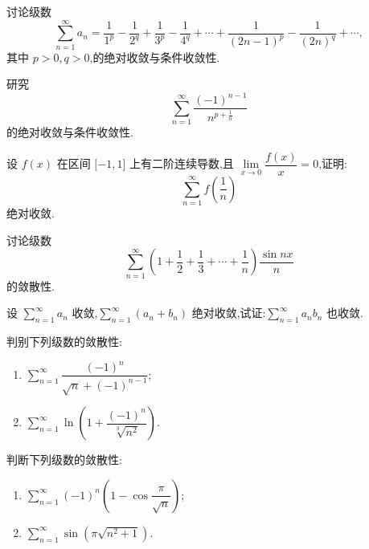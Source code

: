 \documentclass[../数学分析培优讲义.tex]{subfiles}
\begin{document}
\begin{example}
讨论级数
\[
    \sum\limits_{n=1}^{\infty}a_n
    =\dfrac{1}{1^p}-\dfrac{1}{2^q}+\dfrac{1}{3^p}-\dfrac{1}{4^q}+
    \cdots+\dfrac{1}{(2n-1)^p}-\dfrac{1}{(2n)^q}+\cdots,
\]
其中 $p>0,q>0$,的绝对收敛与条件收敛性.
\end{example}
\exampleblank

\begin{example}
研究
\[
    \sum\limits_{n=1}^{\infty}\dfrac{(-1)^{n-1}}{n^{p+\frac{1}{n}}}
\]
的绝对收敛与条件收敛性.
\end{example}
\exampleblank

\begin{example}
设 $f(x)$ 在区间 $\lbrack -1,1\rbrack$ 上有二阶连续导数,且 $\displaystyle\lim\limits_{x\to0}\dfrac{f(x)}{x}=0$,证明:
\[
    \sum\limits_{n=1}^{\infty}f\left(\dfrac{1}{n}\right)
\]
绝对收敛.
\end{example}
\exampleblank

\begin{example}
讨论级数
\[
    \sum\limits_{n=1}^{\infty}\left(1+\dfrac{1}{2}+\dfrac{1}{3}+\cdots+\dfrac{1}{n}\right)\dfrac{\sin nx}{n}
\]
的敛散性.
\end{example}
\exampleblank

\begin{example}
设 $\displaystyle\sum\limits_{n=1}^{\infty}a_n$ 收敛,$\displaystyle\sum\limits_{n=1}^{\infty}(a_n+b_n)$ 绝对收敛,试证:$\displaystyle\sum\limits_{n=1}^{\infty}a_nb_n$ 也收敛.
\end{example}
\exampleblank

\begin{example}
判别下列级数的敛散性:
\begin{enumerate}[label=(\arabic*)]
    \item $\displaystyle\sum\limits_{n=1}^{\infty}\dfrac{(-1)^n}{\sqrt n+(-1)^{n-1}}$;
    \item $\displaystyle\sum\limits_{n=1}^{\infty}\ln\left(1+\dfrac{(-1)^n}{\sqrt[3]{n^2}}\right)$.
\end{enumerate}
\end{example}
\exampleblank

\begin{example}
判断下列级数的敛散性:
\begin{enumerate}[label=(\arabic*)]
    \item $\displaystyle\sum\limits_{n=1}^{\infty}(-1)^n\left(1-\cos\dfrac{\pi}{\sqrt n}\right)$;
    \item $\displaystyle\sum\limits_{n=1}^{\infty}\sin\left(\pi\sqrt{n^2+1}\right)$.
\end{enumerate}
\end{example}
\exampleblank
\end{document}
